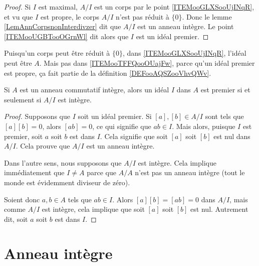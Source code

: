 \begin{proof}
	Si \( I\) est maximal, \( A/I\) est un corps par le point \ref{ITEMooGLXSooUjINqR}, et vu que \( I\) est propre, le corps \( A/I\) n'est pas réduit à \( \{ 0 \}\). Donc le lemme \ref{LemAnnCorpsnonInterdivzer} dit que \( A/I\) est un anneau intègre. Le point \ref{ITEMooUGBTooOGrnWl} dit alors que \( I\) est un idéal premier.
\end{proof}

\begin{remark}
	Puisqu'un corps peut être réduit à \( \{0\}\), dans \ref{ITEMooGLXSooUjINqR}, l'idéal peut être \( A\). Mais pas dans \ref{ITEMooTFFQooOUajFw}, parce qu'un idéal premier est propre, ça fait partie de la définition \ref{DEFooAQSZooVhvQWv}.
\end{remark}

\begin{proposition}     \label{PROPooHABIooBZZQMj}
	Si \( A\) est un anneau commutatif intègre, alors un idéal \( I\) dans \( A\) est premier si et seulement si \( A/I\) est intègre.
\end{proposition}

\begin{proof}
	Supposons que \( I\) soit un idéal premier. Si \( [a],[b] \in A/I\)  sont tels que \( [a][b]=0\), alors \( [ab]=0\), ce qui signifie que \( ab\in I\). Mais alors, puisque \( I\) est premier, soit \( a\) soit \( b\) est dans \( I\). Cela signifie que soit \( [a]\) soit \( [b]\) est nul dans \( A/I\). Cela prouve que \( A/I\) est un anneau intègre.

	Dans l'autre sens, nous supposons que \( A/I\) est intègre. Cela implique immédiatement que \( I\neq A\) parce que \( A/A\) n'est pas un anneau intègre (tout le monde est évidemment diviseur de zéro).

	Soient donc \( a,b\in A\) tels que \( ab\in I\). Alors \( [a][b]=[ab]=0\) dans \( A/I\), mais comme \( A/I\) est intègre, cela implique que soit \( [a]\) soit \( [b]\) est nul. Autrement dit, soit \( a\) soit \( b\) est dans \( I\).
\end{proof}


\section{Anneau intègre}
\label{SECAnneauxIntegres}

